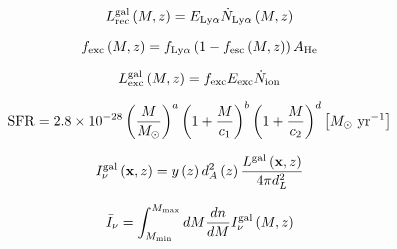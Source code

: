 \begin{equation}
  L_{\rm rec}^{\rm gal} \left( M, z\right) = E_{\rm Ly\alpha} \dot{N}_{\rm Ly\alpha} \left( M, z\right)
\end{equation}

\begin{equation}
  f_{\rm exc} \left( M, z\right) = f_{\rm Ly\alpha} \left( 1 - f_{\rm esc} \left( M, z\right) \right) A_{\rm He}
\end{equation}

\begin{equation}
  L_{\rm exc}^{\rm gal} \left( M, z\right) = f_{\rm exc} E_{\rm exc} \dot{N}_{\rm ion}
\end{equation}

\begin{equation}
  {\rm SFR} = 2.8 \times 10^{-28} \left(\frac{M}{M_{\odot}} \right)^a \left( 1 + \frac{M}{c_1}\right)^b \left(1 + \frac{M}{c_2} \right)^d \left[ M_{\odot} \ {\rm yr}^{-1} \right]
\end{equation}

\begin{equation}
  I_{\nu}^{\rm gal}\left(\textbf{x}, z \right) = y \left(z \right)d_A^2 \left(z \right) \frac{L^{\rm gal} \left(\textbf{x}, z \right)}{4 \pi d_L^2}
\end{equation}

\begin{equation}
  \bar{I}_{\nu} = \int_{M_{\rm min}}^{M_{\rm max}} dM \frac{dn}{dM} I^{\rm gal}_{\nu} \left(M, z \right)
\end{equation}
